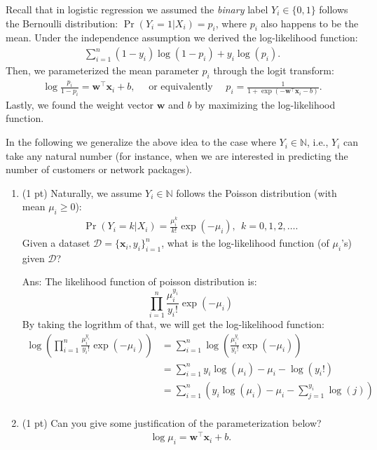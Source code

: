 \documentclass[10pt,letter,notitlepage]{article}
\newcommand{\wv}{\mathbf{w}}
\newcommand{\xv}{\mathbf{x}}
\newcommand{\Dc}{\mathcal{D}}
\newcommand{\ans}[1]{{\color{orange}\textsf{Ans}: #1}}
\newcounter{exercise}
\begin{document}
\begin{exercise}
Recall that in logistic regression we assumed the \emph{binary} label $Y_i \in \{0,1\}$ follows the Bernoulli distribution: $\Pr(Y_i = 1 | X_i) = p_i$, where $p_i$ also happens to be the mean. Under the independence assumption we derived the log-likelihood function:
\begin{align}
\sum_{i=1}^n (1-y_i) \log(1-p_i) + y_i \log(p_i).
\end{align}
Then, we parameterized the mean parameter $p_i$ through the logit transform:
\begin{align}
\log\frac{p_i}{1-p_i} = \wv^\top \xv_i + b, \quad \mbox{ or equivalently } \quad p_i = \frac{1}{1+\exp(-\wv^\top \xv_i - b)}.
\end{align}
Lastly, we found the weight vector $\wv$ and $b$ by maximizing the log-likelihood function. 

In the following we generalize the above idea to the case where $Y_i \in \mathds{N}$, i.e., $Y_i$ can take any natural number (for instance, when we are interested in predicting the number of customers or network packages).

\begin{enumerate}
\item (1 pt) Naturally, we assume $Y_i \in \mathds{N}$ follows the Poisson distribution (with mean $\mu_i \geq 0$):
	\begin{align}
	\Pr(Y_i = k | X_i) = \frac{\mu_i^k}{k!} \exp(-\mu_i), ~~ k = 0, 1, 2, \ldots.
	\end{align}
	Given a dataset $\Dc = \{\xv_i, y_i\}_{i=1}^n$, what is the log-likelihood function (of $\mu_i$'s) given $\Dc$?

\ans{
  The likelihood function of poisson distribution is:
	$$
  \prod_{i=1}^{n} \frac{\mu_i^{y_i}}{y_i!} \exp(-\mu_i)
  $$
  By taking the logrithm of that, we will get the log-likelihood function:
  \begin{align*}
  \log\left(\prod_{i=1}^{n} \frac{\mu_i^{y_i}}{y_i!} \exp(-\mu_i)\right)
  &= \sum_{i=1}^n \log\left(\frac{\mu_i^{y_i}}{y_i!} \exp(-\mu_i)\right) \\
  &= \sum_{i=1}^n y_i \log(\mu_i) - \mu_i - \log(y_i!) \\
  &= \sum_{i=1}^n \left(y_i \log(\mu_i) - \mu_i - \sum_{j=1}^{y_i}\log(j)\right) \\
  \end{align*}
} 
	
\item (1 pt) Can you give some justification of the parameterization below?
	\begin{align*}
	\log\mu_i = \wv^\top \xv_i + b.
	\end{align*}


\end{enumerate}
\end{exercise}
\end{document}
